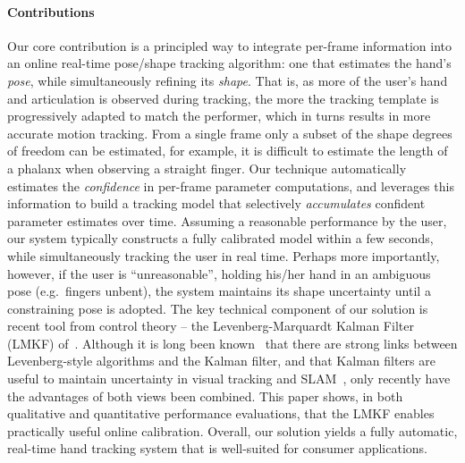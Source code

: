 \paragraph{Contributions}
Our core contribution is a principled way to integrate per-frame information into an online real-time pose/shape tracking algorithm: one that estimates the hand's \emph{pose}, while simultaneously refining its \emph{shape}. That is, as more of the user's hand and articulation is observed during tracking, the more the tracking template is progressively adapted to match the performer, which in turns results in more accurate motion tracking. 
From a single frame only a subset of the shape degrees of freedom can be estimated, for example, it is difficult to estimate the length of a phalanx when observing a straight finger.
Our technique automatically estimates the \emph{confidence} in per-frame parameter computations, and leverages this information to build a tracking model that selectively \emph{accumulates} confident parameter estimates over time. Assuming a reasonable performance by the user, our system typically constructs a fully calibrated model within a few seconds, while simultaneously tracking the user in real time.  Perhaps more importantly, however, if the user is ``unreasonable'', holding his/her hand in an ambiguous pose (e.g.~fingers unbent), the system maintains its shape uncertainty until a constraining pose is adopted.
The key technical component of our solution is recent tool from control theory -- the Levenberg-Marquardt Kalman Filter (LMKF) of~\cite{skoglund2015extended}.  Although it is long been known~\cite{bell1993iterated,bellaire1995new} that there are strong links between Levenberg-style algorithms and the Kalman filter, and that Kalman filters are useful to maintain uncertainty in visual tracking and SLAM~\cite{strasdat2012visual}, only recently have the advantages of both views been combined.   This paper shows, in both qualitative and quantitative performance evaluations, that the LMKF enables practically useful online calibration.
Overall, our solution yields a fully automatic, real-time hand tracking system that is well-suited for consumer applications.
